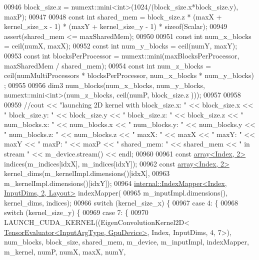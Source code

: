 \begin{DoxyCode}
00946         block\_size.z = numext::mini<int>(1024/(block\_size.x*block\_size.y), maxP);
00947 
00948         \textcolor{keyword}{const} \textcolor{keywordtype}{int} shared\_mem = block\_size.z * (maxX + kernel\_size\_x - 1) * (maxY + kernel\_size\_y - 1) * \textcolor{keyword}{
      sizeof}(Scalar);
00949         assert(shared\_mem <= maxSharedMem);
00950 
00951         \textcolor{keyword}{const} \textcolor{keywordtype}{int} num\_x\_blocks = ceil(numX, maxX);
00952         \textcolor{keyword}{const} \textcolor{keywordtype}{int} num\_y\_blocks = ceil(numY, maxY);
00953         \textcolor{keyword}{const} \textcolor{keywordtype}{int} blocksPerProcessor = numext::mini(maxBlocksPerProcessor, maxSharedMem / shared\_mem);
00954         \textcolor{keyword}{const} \textcolor{keywordtype}{int} num\_z\_blocks = ceil(numMultiProcessors * blocksPerProcessor, num\_x\_blocks * num\_y\_blocks)
      ;
00955 
00956         dim3 num\_blocks(num\_x\_blocks, num\_y\_blocks, numext::mini<int>(num\_z\_blocks, ceil(numP, block\_size.z
      )));
00957 
00958 
00959         \textcolor{comment}{//cout << "launching 2D kernel with block\_size.x: " << block\_size.x << " block\_size.y: " <<
       block\_size.y  << " block\_size.z: " << block\_size.z << " num\_blocks.x: " << num\_blocks.x << " num\_blocks.y: " <<
       num\_blocks.y << " num\_blocks.z: " << num\_blocks.z << " maxX: " << maxX << " maxY: " << maxY << " maxP: " <<
       maxP << " shared\_mem: " << shared\_mem << " in stream " << m\_device.stream() << endl;}
00960 
00961         \textcolor{keyword}{const} \hyperlink{class_eigen_1_1array}{array<Index, 2>} indices(m\_indices[idxX], m\_indices[idxY]);
00962         \textcolor{keyword}{const} \hyperlink{class_eigen_1_1array}{array<Index, 2>} kernel\_dims(m\_kernelImpl.dimensions()[idxX],
00963                                           m\_kernelImpl.dimensions()[idxY]);
00964         \hyperlink{class_eigen_1_1internal_1_1_index_mapper}{internal::IndexMapper<Index, InputDims, 2, Layout>}
       indexMapper(
00965             m\_inputImpl.dimensions(), kernel\_dims, indices);
00966         \textcolor{keywordflow}{switch} (kernel\_size\_x) \{
00967           \textcolor{keywordflow}{case} 4: \{
00968             \textcolor{keywordflow}{switch} (kernel\_size\_y) \{
00969               \textcolor{keywordflow}{case} 7: \{
00970                 LAUNCH\_CUDA\_KERNEL((EigenConvolutionKernel2D<
      \hyperlink{struct_eigen_1_1_tensor_evaluator}{TensorEvaluator<InputArgType, GpuDevice>}, Index, InputDims, 4, 7>),
       num\_blocks, block\_size, shared\_mem, m\_device, m\_inputImpl, indexMapper, m\_kernel, numP, numX, maxX, numY, 

\end{DoxyCode}
